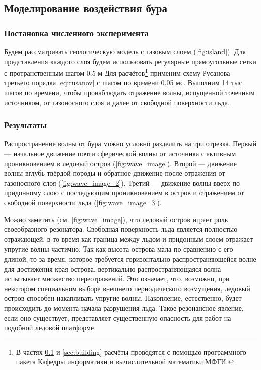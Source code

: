 \subsection{Моделирование воздействия бура}
\label{sec:drill}
\subsubsection{Постановка численного эксперимента}

Будем рассматривать геологическую модель с газовым слоем (\autoref{fig:island}). Для представления каждого слоя будем использовать регулярные прямоугольные сетки с протранственным шагом 0.5 м Для расчётов\footnote{В частях \ref{sec:drill} и \ref{sec:building} расчёты проводятся с помощью программного пакета Кафедры информатики и вычислительной математики МФТИ.} применим схему Русанова третьего порядка \eqref{eq:rusanov} с шагом по времени 0.05 мс. Выполним 14 тыс. шагов по времени, чтобы пронаблюдать отражение волны, испущенной точечным источником, от газоносного слоя и далее от свободной поверхности льда.

\subsubsection{Результаты}

Распространение волны от бура можно условно разделить на три  отрезка. Первый --- начальное движение почти  сферической волны от источника с активным проникновением в ледовый остров (\autoref{fig:wave_image}). Второй --- движение волны вглубь твёрдой породы и обратное движение после отражения от газоносного слоя (\autoref{fig:wave_image_2}). Третий --- движение волны вверх по придонному слою с последующим проникновением в остров и отражением от свободной поверхности льда (\autoref{fig:wave_image_3}).

Можно заметить (см. \autoref{fig:wave_image}), что ледовый остров играет роль своеобразного резонатора. Свободная поверхность льда является полностью отражающей, в то время как граница между льдом и придонным слоем отражает упругие волны частично. Так как высота острова мала по сравнению с его длиной, то за время, которое требуется  горизонтально распространяющейся волне для достижения края острова, вертикально распространяющаяся волна испытывает множество переотражений. Это означает, что, возможно, при некотором специальном выборе внешнего периодического возмущения, ледовый остров способен накапливать упругие волны. Накопление, естественно, будет происходить до момента начала разрушения льда. Такое резонансное явление, если оно существует, представляет существенную опасность для работ на подобной ледовой платформе.

